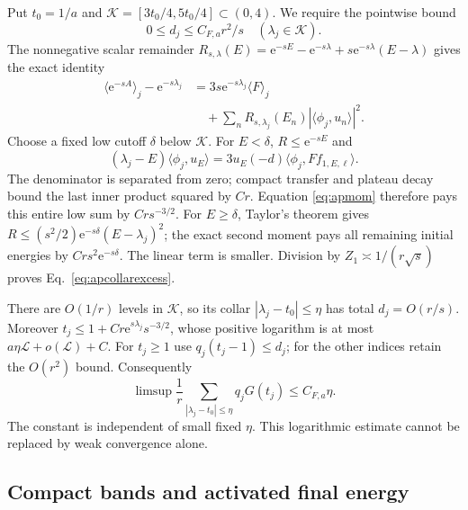 \documentclass[aps,pra,reprint,superscriptaddress,longbibliography]{revtex4-2}
\newcommand{\ee}{\mathrm e}
\newcommand{\ip}[2]{\langle#1,#2\rangle}
\begin{document}
Put $t_0=1/a$ and $\mathcal K=[3t_0/4,5t_0/4]\subset(0,4)$.
We require the pointwise bound
\begin{equation}
             0\le d_j\le C_{F,a}r^2/s
                              \quad(\lambda_j\in\mathcal K). \label{eq:apcollarexcess}
\end{equation}
The nonnegative scalar remainder
$R_{s,\lambda}(E)=\ee^{-sE}-\ee^{-s\lambda}
+s\ee^{-s\lambda}(E-\lambda)$ gives the exact identity
\begin{align}
 \langle\ee^{-sA}\rangle_j-\ee^{-s\lambda_j}
 &=3s\ee^{-s\lambda_j}\langle F\rangle_j\nonumber\\
 &\quad+\sum_nR_{s,\lambda_j}(E_n)|\ip{\phi_j}{u_n}|^2. \label{eq:apremainder}
\end{align}
Choose a fixed low cutoff $\delta$ below $\mathcal K$. For $E<\delta$,
$R\le\ee^{-sE}$ and
\begin{equation}
 (\lambda_j-E)\ip{\phi_j}{u_E}
       =3u_E(-d)\ip{\phi_j}{Ff_{1,E,\ell}}.              \label{eq:apbandidentity}
\end{equation}
The denominator is separated from zero; compact transfer and plateau
decay bound the last inner product squared by $Cr$. Equation
\eqref{eq:apmom} therefore pays this entire low sum by $Crs^{-3/2}$.
For $E\ge\delta$, Taylor's theorem gives
$R\le(s^2/2)\ee^{-s\delta}(E-\lambda_j)^2$; the exact second moment
pays all remaining initial energies by $Crs^2\ee^{-s\delta}$.
The linear term is smaller. Division by $Z_1\asymp1/(r\sqrt s)$
proves Eq.~\eqref{eq:apcollarexcess}.

There are $O(1/r)$ levels in $\mathcal K$, so its collar
$|\lambda_j-t_0|\le\eta$ has total $d_j=O(r/s)$. Moreover
$t_j\le1+Cr\ee^{s\lambda_j}s^{-3/2}$, whose positive logarithm is
at most $a\eta\mathcal L+o(\mathcal L)+C$. For $t_j\ge1$ use
$q_j(t_j-1)\le d_j$; for the other indices retain the $O(r^2)$
bound. Consequently
\begin{equation}
 \limsup\frac1r\sum_{|\lambda_j-t_0|\le\eta}q_jG(t_j)
                                  \le C_{F,a}\eta.        \label{eq:apentropycollar}
\end{equation}
The constant is independent of small fixed $\eta$. This logarithmic
estimate cannot be replaced by weak convergence alone.

\subsection{Compact bands and activated final energy}
\end{document}
